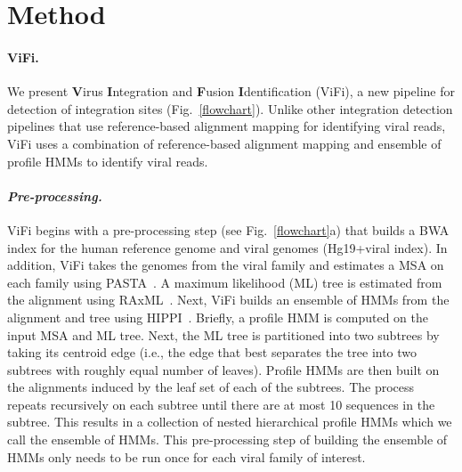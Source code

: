 \documentclass[10pt]{article}
\begin{document}
 
\section*{Method}
\paragraph{\textbf{ViFi.}}
We present \textbf{V}irus \textbf{I}ntegration and \textbf{F}usion \textbf{I}dentification (ViFi), a new pipeline for detection of integration sites (Fig.~\ref{flowchart}).  Unlike other integration detection pipelines that use reference-based alignment mapping for identifying viral reads, ViFi uses a combination of reference-based alignment mapping and ensemble of profile HMMs to identify viral reads.  

\paragraph{\emph{Pre-processing.}} ViFi begins with a pre-processing step (see Fig.~\ref{flowchart}a) that builds a BWA index for the human reference genome and viral genomes (Hg19+viral index).  In addition, ViFi takes the genomes from the viral family and estimates a MSA on each family using PASTA~\cite{Mirarab2014}.  A maximum likelihood (ML) tree is estimated from the alignment using RAxML~\cite{Stamatakis2014}.  Next, ViFi builds an ensemble of HMMs from the alignment and tree using HIPPI~\cite{Nguyen2016_hippi}.  Briefly, a profile HMM is computed on the input MSA and ML tree.  Next, the ML tree is partitioned into two subtrees by taking its centroid edge (i.e., the edge that best separates the tree into two subtrees with roughly equal number of leaves).  Profile HMMs are then built on the alignments induced by the leaf set of each of the subtrees.  The process repeats recursively on each subtree until there are at most 10 sequences in the subtree.  This results in a collection of nested hierarchical profile HMMs which we call the ensemble of HMMs.  This pre-processing step of building the ensemble of HMMs only needs to be run once for each viral family of interest.
\end{document}
